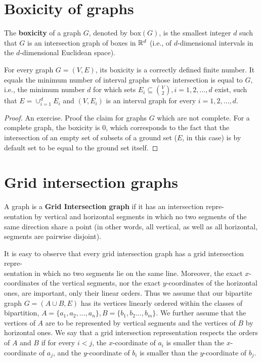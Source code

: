 \section{Boxicity of graphs}

\begin{defn}
	The \textbf{boxicity} of a graph $G$, denoted by $\text{box}(G)$, is the smallest integer $d$ such that $G$ is an intersection graph of boxes in $\mathbb{R}^d$ (i.e., of $d$-dimensional intervals in the $d$-dimensional Euclidean space).
\end{defn}

\begin{prop}
For every graph $G = (V, E)$, its boxicity is a correctly defined finite number. It equals the minimum number of interval graphs whose intersection is equal to $G$, i.e., the minimum number $d$ for which sets $E_i \subseteq \binom{V}{2} , i = 1, 2, \dots, d$ exist, such that $E = \cup_{i=1}^d E_i$ and $(V, E_i)$ is an interval graph for every $i = 1, 2, \dots, d$.
\end{prop}

\begin{proof}
	An exercise. Proof the claim for graphs $G$ which are not complete. For a complete graph, the boxicity is $0$, which corresponds to the fact that the intersection of an empty set of subsets of a ground set ($E$, in this case) is by default set to be equal to the ground set itself.
\end{proof}

\section{Grid intersection graphs}

\begin{defn}
	A graph is a \textbf{Grid Intersection graph} if it has an intersection repre-\\sentation by vertical and horizontal segments in which no two segments of the same direction share a point (in other words, all vertical, as well as all horizontal, segments are pairwise disjoint).
\end{defn}

It is easy to observe that every grid intersection graph has a grid intersection repre-\\sentation in which no two segments lie on the same line. Moreover, the exact $x$-coordinates of the vertical segments, nor the exact $y$-coordinates of the horizontal ones, are important, only their linear orders. Thus we assume that our bipartite graph $G = (A \cup B, E)$ has its vertices linearly ordered within the classes of bipartition, $A = \{a_1 , a_2 , \dots, a_n\}, B = \{b_1 , b_2 \dots, b_m\}$. We further assume that the vertices of $A$ are to be represented by vertical segments and the vertices of $B$ by horizontal ones. We say that a grid intersection representation respects the orders of $A$ and $B$ if for every $i < j$, the $x$-coordinate of $a_i$ is smaller than the $x$-coordinate of $a_j$, and the $y$-coordinate of $b_i$ is smaller than the $y$-coordinate of $b_j$.

